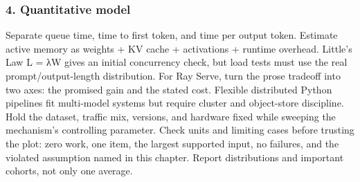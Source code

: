 \subsubsection*{4. Quantitative model}
Separate queue time, time to first token, and time per output token. Estimate active memory as weights + KV cache + activations + runtime overhead. Little's Law L = λW gives an initial concurrency check, but load tests must use the real prompt/output-length distribution.
For Ray Serve, turn the prose tradeoff into two axes: the promised gain and the stated cost. Flexible distributed Python pipelines fit multi-model systems but require cluster and object-store discipline. Hold the dataset, traffic mix, versions, and hardware fixed while sweeping the mechanism's controlling parameter.
Check units and limiting cases before trusting the plot: zero work, one item, the largest supported input, no failures, and the violated assumption named in this chapter. Report distributions and important cohorts, not only one average.
